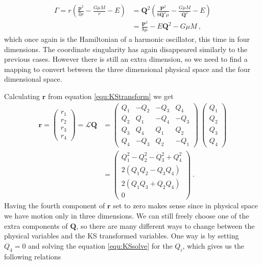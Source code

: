 \documentclass[english, oneside]{HYgradu}
\begin{document}
\begin{align}
\Gamma = r \left( \frac{\mathbf{p}^2}{2 \mu} - \frac{G \mu M}{r} - E \right) &= \mathbf{Q}^2 \left( \frac{\mathbf{P}^2}{8 \mathbf{Q}^2 \mu} - \frac{G \mu M}{\mathbf{Q}^2} - E \right) \nonumber \\ 
&= \frac{\mathbf{P}^2}{8 \mu} - E \mathbf{Q}^2 - G \mu M \ ,
\end{align}
which once again is the Hamiltonian of a harmonic oscillator, this time in four dimensions. The coordinate singularity has again disappeared similarly to the previous cases.
However there is still an extra dimension, so we need to find a mapping to convert between the three dimensional physical space and the four dimensional space.

Calculating $\mathbf{r}$ from equation \ref{equ:KStransform} we get
\begin{align} \label{equ:KSsolve}
\mathbf{r} = 
\begin{pmatrix}
r_1 \\
r_2 \\
r_3 \\
r_4
\end{pmatrix}
= \mathcal{L} \mathbf{Q} &=
\begin{pmatrix}
Q_1 & -Q_2 & -Q_3 & Q_4 \\
Q_2 & Q_1 & -Q_4 & -Q_3 \\
Q_3 & Q_4 & Q_1 & Q_2 \\
Q_4 & -Q_3 & Q_2 & -Q_1
\end{pmatrix} \ 
\begin{pmatrix}
Q_1 \\
Q_2 \\
Q_3 \\
Q_4
\end{pmatrix}
\nonumber \\
&= 
\begin{pmatrix}
Q_1^2 - Q_2^2 - Q_3^2 + Q_4^2 \\
2(Q_1 Q_2 - Q_3 Q_4) \\
2(Q_1 Q_3 + Q_2 Q_4) \\
0
\end{pmatrix} \ .
\end{align}
Having the fourth component of $\mathbf{r}$ set to zero makes sense since in physical space we have motion only in three dimensions.
We can still freely choose one of the extra components of $\mathbf{Q}$, so there are many different ways to change between the physical variables and the KS transformed variables. One way is by setting $Q_4 = 0$ and solving the equation \ref{equ:KSsolve} for the $Q_i$, which gives us the following relations
\end{document}
